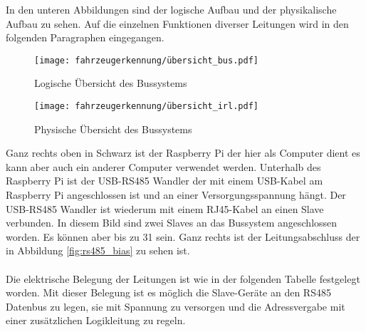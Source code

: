 In den unteren Abbildungen sind der logische Aufbau und der physikalische Aufbau zu sehen.
Auf die einzelnen Funktionen diverser Leitungen wird in den folgenden Paragraphen eingegangen.

\begin{figure}[H]
    \centering
    \texttt{[image: fahrzeugerkennung/übersicht\_bus.pdf]}
    \caption{Logische Übersicht des Bussystems}
\end{figure}

\begin{figure}[H]
    \centering
    \texttt{[image: fahrzeugerkennung/übersicht\_irl.pdf]}
    \caption{Physische Übersicht des Bussystems}
    \label{fig:bus_physical_overview}
\end{figure}
Ganz rechts oben in Schwarz ist der Raspberry Pi der hier als Computer dient es kann aber auch ein anderer Computer verwendet werden. Unterhalb des Raspberry Pi ist der USB-RS485 Wandler der mit einem USB-Kabel
am Raspberry Pi angeschlossen ist und an einer Versorgungsspannung hängt. Der USB-RS485 Wandler ist wiederum mit einem RJ45-Kabel an einen Slave verbunden. In diesem Bild sind zwei Slaves an das Bussystem angeschlossen worden.
Es können aber bis zu 31 sein. Ganz rechts ist der Leitungsabschluss der in Abbildung \ref{fig:rs485_bias} zu sehen ist.
\\ \\
Die elektrische Belegung der Leitungen ist wie in der folgenden Tabelle festgelegt worden. Mit dieser Belegung ist es möglich die Slave-Geräte an den RS485 Datenbus zu legen,
sie mit Spannung zu versorgen und die Adressvergabe mit einer zusätzlichen Logikleitung zu regeln. 

